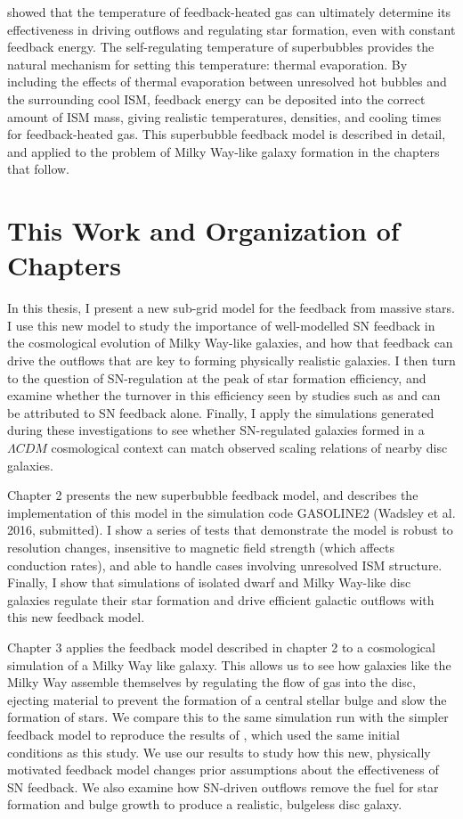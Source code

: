 \citet{DallaVecchia2012} showed that the temperature of feedback-heated gas can
ultimately determine its effectiveness in driving outflows and regulating star
formation, even with constant feedback energy.  The self-regulating temperature
of superbubbles provides the natural mechanism for setting this temperature:
thermal evaporation.  By including the effects of thermal evaporation between
unresolved hot bubbles and the surrounding cool ISM, feedback energy can be
deposited into the correct amount of ISM mass, giving realistic temperatures,
densities, and cooling times for feedback-heated gas.  This superbubble feedback
model is described in detail, and applied to the problem of Milky Way-like
galaxy formation in the chapters that follow.

\section{This Work and Organization of Chapters}
In this thesis, I present a new sub-grid model for the feedback from massive
stars.  I use this new model to study the importance of well-modelled SN
feedback in the cosmological evolution of Milky Way-like galaxies, and how that
feedback can drive the outflows that are key to forming physically realistic
galaxies.  I then turn to the question of SN-regulation at the peak of star
formation efficiency, and examine whether the turnover in this efficiency seen
by studies such as \citet{Behroozi2013} and \citet{Moster2013} can be attributed
to SN feedback alone.  Finally, I apply the simulations generated during these
investigations to see whether SN-regulated galaxies formed in a $\Lambda CDM$
cosmological context can match observed scaling relations of nearby disc
galaxies.

Chapter 2 presents the new superbubble feedback model, and describes the
implementation of this model in the simulation code {\sc GASOLINE2} (Wadsley et
al. 2016, submitted).  I show a series of tests that demonstrate the model is
robust to resolution changes, insensitive to magnetic field strength (which
affects conduction rates), and able to handle cases involving unresolved ISM
structure.  Finally, I show that simulations of isolated dwarf and Milky
Way-like disc galaxies regulate their star formation and drive efficient
galactic outflows with this new feedback model.

Chapter 3 applies the feedback model described in chapter 2 to a cosmological
simulation of a Milky Way like galaxy.  This allows us to see how galaxies like
the Milky Way assemble themselves by regulating the flow of gas into the disc,
ejecting material to prevent the formation of a central stellar bulge and slow
the formation of stars.  We compare this to the same simulation run with the
simpler \citet{Stinson2006} feedback model to reproduce the results of
\citet{Stinson2010}, which used the same initial conditions as this study.  We
use our results to study how this new, physically motivated feedback model
changes prior assumptions about the effectiveness of SN feedback.  We also
examine how SN-driven outflows remove the fuel for star formation and bulge
growth to produce a realistic, bulgeless disc galaxy.

